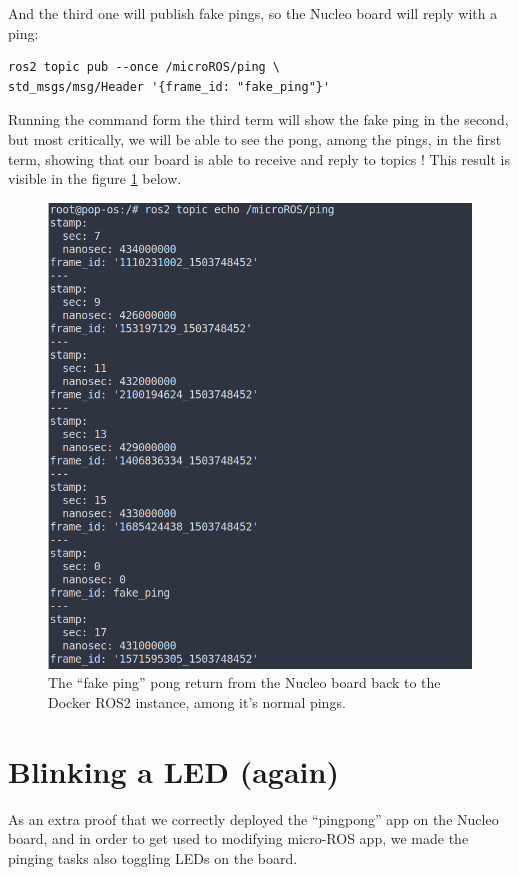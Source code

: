 \documentclass[10pt]{article}
\begin{document}
And the third one will publish fake pings, so the Nucleo board will reply with a ping:
\begin{tcolorbox}
\begin{verbatim}
ros2 topic pub --once /microROS/ping \
std_msgs/msg/Header '{frame_id: "fake_ping"}'
\end{verbatim}
\end{tcolorbox}

Running the command form the third term will show the fake ping in the second, but most critically, we will be able to see the pong, among the pings, in the first term, showing that our board is able to receive and reply to topics ! This result is visible in the figure \ref{fig:pingpong} below.


\begin{figure}[H]
  \centering
  \includegraphics[width=.9\textwidth]{./img/pingpong.png}
  \caption{The ``fake ping'' pong return from the Nucleo board back to the Docker ROS2 instance, among it's normal pings.}
  \label{fig:pingpong}
\end{figure}


\section{Blinking a LED (again)}
\label{sec:blinking-led-again}
As an extra proof that we correctly deployed the ``pingpong'' app on the Nucleo board, and in order to get used to modifying micro-ROS app, we made the pinging tasks also toggling LEDs on the board.
\end{document}
